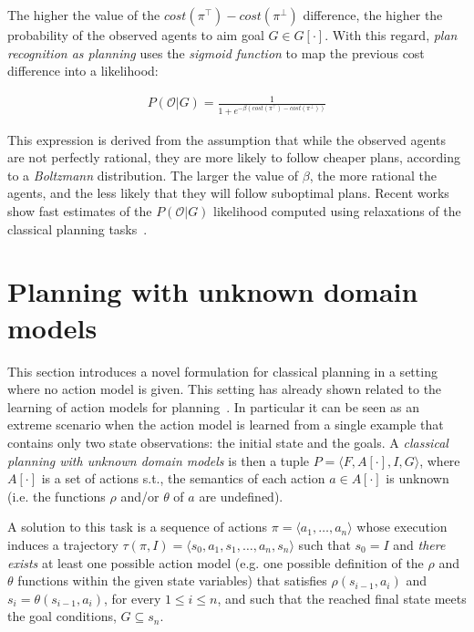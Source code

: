 \documentclass{article}
\newcommand{\tup}[1]{{\langle #1 \rangle}}
\begin{document}
The higher the value of the $cost(\pi^\top)-cost(\pi^\bot)$ difference, the higher the probability of the observed agents to aim goal $G\in G[\cdot]$. With this regard, {\em plan recognition as planning} uses the {\em sigmoid function} to map the previous cost difference into a likelihood:

\begin{align}
P(\mathcal{O}|G) = \frac{1}{1+e^{-\beta(cost(\pi^\top)-cost(\pi^\bot))}}
\end{align}

This expression is derived from the assumption that while the observed agents are not perfectly rational, they are more likely to follow cheaper plans, according to a {\em Boltzmann} distribution. The larger the value of $\beta$, the more rational the agents, and the less likely that they will follow suboptimal plans. Recent works show fast estimates of the $P(\mathcal{O}|G)$ likelihood computed using relaxations of the classical planning tasks~\cite{pereira2017landmark}.



\section{Planning with unknown domain models}
\label{sec:planning}
This section introduces a novel formulation for classical planning in a setting where no action model is given. This setting has already shown related to the learning of action models for planning~\cite{SternJ17}. In particular it can be seen as an extreme scenario when the action model is learned from a single example that contains only two state observations: the initial state and the goals. A {\em classical planning with unknown domain models} is then a tuple $P=\tup{F,A[\cdot],I,G}$, where $A[\cdot]$ is a set of actions s.t., the semantics of each action $a\in A[\cdot]$ is unknown (i.e. the functions $\rho$ and/or $\theta$ of $a$ are undefined). 

A solution to this task is a sequence of actions $\pi=\tup{a_1, \ldots, a_n}$ whose execution induces a trajectory $\tau(\pi,I)=\tup{s_0, a_1, s_1, \ldots, a_n, s_n}$ such that $s_0=I$ and {\em there exists} at least one possible action model (e.g. one possible definition of the $\rho$ and $\theta$ functions within the given state variables) that satisfies $\rho(s_{i-1},a_i)$ and $s_i=\theta(s_{i-1},a_i)$, for every {\small $1\leq i\leq n$}, and such that the reached final state meets the goal conditions, $G \subseteq s_n$. 
\end{document}
